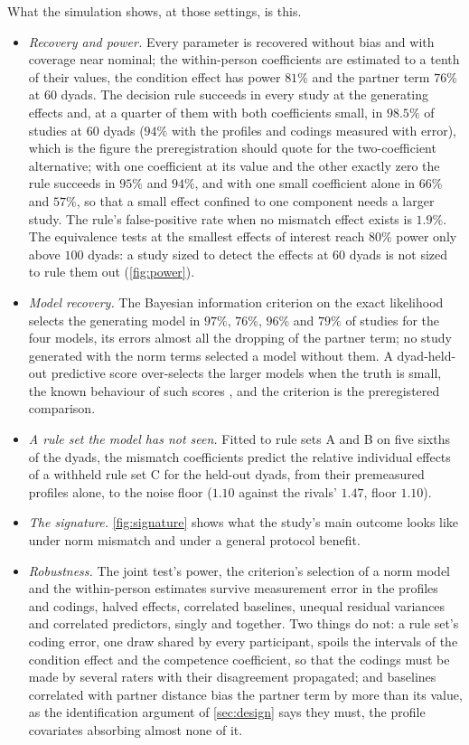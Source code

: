What the simulation shows, at those settings, is this.
\begin{itemize}[leftmargin=*]
\item \emph{Recovery and power.} Every parameter is recovered without bias and with coverage near nominal; the within-person coefficients are estimated to a tenth of their values, the condition effect has power $81\%$ and the partner term $76\%$ at $60$ dyads. The decision rule succeeds in every study at the generating effects and, at a quarter of them with both coefficients small, in $98.5\%$ of studies at $60$ dyads ($94\%$ with the profiles and codings measured with error), which is the figure the preregistration should quote for the two-coefficient alternative; with one coefficient at its value and the other exactly zero the rule succeeds in $95\%$ and $94\%$, and with one small coefficient alone in $66\%$ and $57\%$, so that a small effect confined to one component needs a larger study. The rule's false-positive rate when no mismatch effect exists is $1.9\%$. The equivalence tests at the smallest effects of interest reach $80\%$ power only above $100$ dyads: a study sized to detect the effects at $60$ dyads is not sized to rule them out (\autoref{fig:power}).
\item \emph{Model recovery.} The Bayesian information criterion on the exact likelihood selects the generating model in $97\%$, $76\%$, $96\%$ and $79\%$ of studies for the four models, its errors almost all the dropping of the partner term; no study generated with the norm terms selected a model without them. A dyad-held-out predictive score over-selects the larger models when the truth is small, the known behaviour of such scores \cite{Stone1977, Shao1993}, and the criterion is the preregistered comparison.
\item \emph{A rule set the model has not seen.} Fitted to rule sets A and B on five sixths of the dyads, the mismatch coefficients predict the relative individual effects of a withheld rule set C for the held-out dyads, from their premeasured profiles alone, to the noise floor ($1.10$ against the rivals' $1.47$, floor $1.10$).
\item \emph{The signature.} \autoref{fig:signature} shows what the study's main outcome looks like under norm mismatch and under a general protocol benefit.
\item \emph{Robustness.} The joint test's power, the criterion's selection of a norm model and the within-person estimates survive measurement error in the profiles and codings, halved effects, correlated baselines, unequal residual variances and correlated predictors, singly and together. Two things do not: a rule set's coding error, one draw shared by every participant, spoils the intervals of the condition effect and the competence coefficient, so that the codings must be made by several raters with their disagreement propagated; and baselines correlated with partner distance bias the partner term by more than its value, as the identification argument of \autoref{sec:design} says they must, the profile covariates absorbing almost none of it.
\end{itemize}
